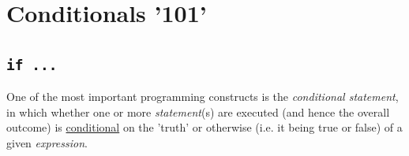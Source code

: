 \documentclass{tufte-book} %
\begin{document}

\newpage


\section{Conditionals '101'}


\subsection{\texttt{if ...}}

One of the most important programming constructs is the \textit{conditional statement}, in which whether one or more \textit{statement}(s) are executed (and hence the overall outcome) is \uline{conditional} on the 'truth' or otherwise (i.e. it being true or false) of a given \textit{expression}.
\end{document}
